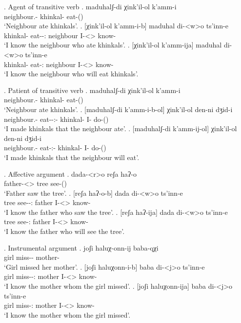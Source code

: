 \ex. Agent of transitive verb
	\ag. maduhalʃ-di χink'il-ol k'amm-i\\
			{neighbour.\Obl-\Erg} {khinkal-\Pl} {eat-\Pst(\Aor)}\\
			\glt `Neighbour ate khinkals'.
	\bg. [χink'il-ol k'amm-i-b] maduhal di-<w>o ts'inn-e \\
			{khinkal-\Pl} {eat-\Pst-\Ptcp:\Pst} neighbour {I-<\M>\Aff} {know-\Hab} \\
		 \glt    `I know the neighbour who ate khinkals'.
	\bg. [χink'il-ol k'amm-ija] maduhal di-<w>o ts'inn-e \\
			{khinkal-\Pl} {eat-\Ptcp:\Prae} neighbour {I-<\M>\Aff} {know-\Hab} \\
		 \glt    `I know the neighbour who will eat khinkals'.

\ex. Patient of transitive verb
	\ag. maduhalʃ-di χink'il-ol k'amm-i\\
			{neighbour.\Obl-\Erg} {khinkal-\Pl} {eat-\Pst(\Aor)}\\
			\glt `Neighbour ate khinkals'.
	\bg. [maduhalʃ-di k'amm-i-b-ol] χink'il-ol den-ni dʒid-i\\
			{neighbour.\Obl-\Erg} {eat-\Pst-\Ptcp:\Pst-\Pl} {khinkal-\Pl}  {I-\Erg} {do-\Pst(\Aor)}\\
		 \glt    `I made khinkals that the neighbour ate'.
	\bg. [maduhalʃ-di k'amm-ij-ol] χink'il-ol den-ni dʒid-i\\
			{neighbour.\Obl-\Erg} {eat-\Ptcp:\Prae-\Pl} {khinkal-\Pl}  {I-\Erg} {do-\Pst(\Aor)}\\
		 \glt    `I made khinkals that the neighbour will eat'.		

\ex. Affective argument
	\ag. dada-<r>o reʃa haʔ-o\\
			{father-<\Nans>\Aff} tree {see-\Pst(\Aor)}\\
			\glt `Father saw the tree'.
	\bg. [reʃa haʔ-o-b] dada di-<w>o ts'inn-e\\
			tree {see-\Pst-\Ptcp:\Pst} father {I-<\M>\Aff} {know-\Hab}\\
			\glt `I know the father who saw the tree'.
	\bg. [reʃa haʔ-ija] dada di-<w>o ts'inn-e\\
			tree {see-\Ptcp:\Prae} father {I-<\M>\Aff} {know-\Hab}\\
			\glt `I know the father who will see the tree'.

\ex. Instrumental argument
	\ag. joʃi haluχ-onn-ij baba-qχi\\
			{girl} {miss-\Pst-\Pf} {mother-\Inst}\\
			\glt `Girl missed her mother'.
	\bg. [joʃi haluχonn-i-b] baba  di-<j>o ts'inn-e\\
			{girl} {miss-\Pst-\Ptcp:\Pst} mother {I-<\M>\Aff} {know-\Hab}\\
			\glt `I know the mother  whom the girl missed'.
	\bg. [joʃi haluχonn-ija] baba  di-<j>o ts'inn-e\\
			{girl} {miss-\Ptcp:\Prae} mother {I-<\M>\Aff} {know-\Hab}\\
			\glt `I know the mother  whom the girl missed'.

